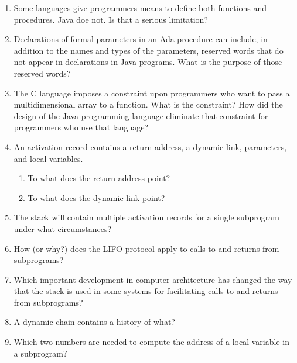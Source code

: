 \begin{enumerate}
  \begin{answer}
   
  \end{answer}

  \item Some languages give programmers means to define
    both functions and procedures. Java doe not. Is that
    a serious limitation?

  \begin{answer}
   
  \end{answer}

  \item Declarations of formal parameters in an Ada procedure
    can include, in addition to the names and types of the
    parameters, reserved words that do not appear in declarations
    in Java programs. 
    What is the purpose of those reserved words?
 
  \item The C language imposes a constraint upon programmers
    who want to pass a multidimensional array to a function.
    What is the constraint? How did the design of the Java
    programming language eliminate that constraint for 
    programmers who use that language?

  \item An activation record contains a return
    address, a dynamic link, parameters, and
    local variables.
  \begin{enumerate}
    \item To what does the return address point?
    \item To what does the dynamic link point?
    \end{enumerate}

  \item The stack will contain multiple activation
    records for a single subprogram under what
    circumstances?

  \item How (or why?) does the LIFO protocol apply to
    calls to and returns from subprograms?

  \item Which important development in computer architecture
    has changed the way that the stack is used in some
    systems for facilitating calls to and returns from
    subprograms?

  \item A dynamic chain contains a history of what?

  \item Which two numbers are needed to compute
    the address of a local variable in a subprogram?


\end{enumerate}
